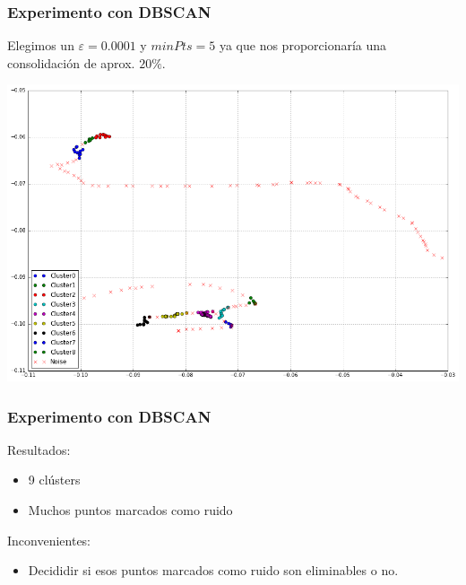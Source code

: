 \documentclass[10pt, spanish]{beamer}
\begin{document}
\begin{frame}[fragile]
\frametitle{Experimento con DBSCAN}
Elegimos un $\varepsilon = 0.0001$ y $minPts = 5$ ya que nos proporcionar\'ia una consolidaci\'on de aprox. $20\%$.\\
\begin{center}
	\includegraphics[scale=.3]{dbscanSujeto1.png}
\end{center}
\end{frame}

\begin{frame}[fragile]
\frametitle{Experimento con DBSCAN}
Resultados:\\
\begin{itemize}
\item 9 cl\'usters
\item Muchos puntos marcados como ruido
\end{itemize}

Inconvenientes:
\begin{itemize}
\item Decididir si esos puntos marcados como ruido son eliminables o no.
\end{itemize}
\end{frame}

\end{document}
